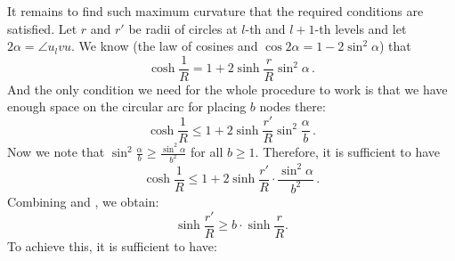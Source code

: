 \documentclass{article} %
\begin{document}
It remains to find such maximum curvature that the required conditions are satisfied. Let $r$ and $r'$ be radii of circles at $l$-th and $l+1$-th levels and let $2\alpha = \angle u_l v u$. We know (the law of cosines and $\cos 2\alpha = 1 - 2\sin^2 \alpha$) that
\begin{equation}\label{eq:1}
\cosh \frac{1}{R} = 1 + 2 \sinh \frac{r}{R} \sin^2 \alpha \,.
\end{equation}
And the only condition we need for the whole procedure to work is that we have enough space on the circular arc for placing $b$ nodes there:
\[
\cosh \frac{1}{R} \le 1 + 2 \sinh \frac{r'}{R} \sin^2 \frac{\alpha}{b} \,.
\]
Now we note that $\sin^2 \frac{\alpha}{b} \ge \frac{\sin^2 \alpha}{b^2}$ for all $b \ge 1$. Therefore, it is sufficient to have
\begin{equation}\label{eq:2}
\cosh \frac{1}{R} \le 1 + 2 \sinh \frac{r'}{R} \cdot \frac{\sin^2 \alpha}{b^2} \,.
\end{equation}
Combining  and , we obtain:
\[
\sinh \frac{r'}{R} \ge b \cdot \sinh \frac{r}{R}.
\]
To achieve this, it is sufficient to have:
\end{document}
